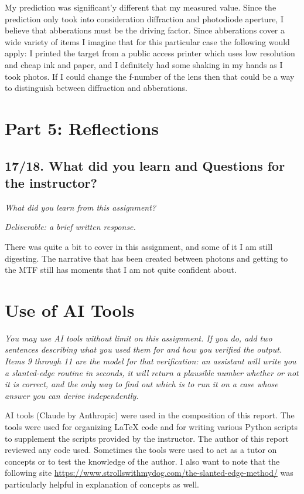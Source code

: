 \documentclass[11pt]{article}
\newcommand{\task}[3]{\subsection*{#1}{\sloppy\noindent\textit{#2}\par}\smallskip\noindent\textit{Deliverable: #3}\par\medskip}
\begin{document}
My prediction was significant'y different that my measured value. Since the prediction only took into consideration diffraction and photodiode aperture, I believe that abberations must
be the driving factor. Since abberations cover a wide variety of items I imagine that for this particular case the following would apply: I printed the target from a public access printer
which uses low resolution and cheap ink and paper, and I definitely had some shaking in my hands as I took photos. If I could change the f-number of the lens then that could be a way to
distinguish between diffraction and abberations.
\section*{Part 5: Reflections}

\task{17/18. What did you learn and Questions for the instructor?}
{What did you learn from this assignment?}
{a brief written response.}

There was quite a bit to cover in this assignment, and some of it I am still digesting. The narrative that has been created between photons and getting to the MTF still has
moments that I am not quite confident about.

\section*{Use of AI Tools}
\noindent\textit{You may use AI tools without limit on this assignment. If you do, add two sentences describing what you used them for and how you verified the output. Items 9 through 11 are the model for that verification: an assistant will write you a slanted-edge routine in seconds, it will return a plausible number whether or not it is correct, and the only way to find out which is to run it on a case whose answer you can derive independently.}\par\medskip

AI tools (Claude by Anthropic) were used in the composition of this report. The tools were used for organizing LaTeX code and for writing various Python scripts to supplement the
scripts provided by the instructor. The author of this report reviewed any code used. Sometimes the tools were used to act as a tutor on concepts or to test the knowledge of the author.
I also want to note that the following site \url{https://www.strollswithmydog.com/the-slanted-edge-method/} was particularly helpful in explanation of concepts as well.
\end{document}
